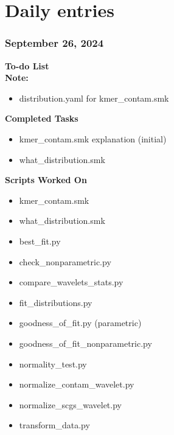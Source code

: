 \documentclass[11pt]{report}
\newcommand{\done}{\checkmark}
\newcommand{\draft}{\faPencil}
\begin{document}
{\newpage






\nolinenumbers
\part{Daily entries}

\pagestyle{fancy}
\fancyhf{}
\fancyhead[C]{\leftmark}  %
\fancyhead[R]{\thepage}

\renewcommand{\thesection}{\arabic{section}}
\setcounter{section}{0}
\setcounter{subsection}{0}

	

\begin{multicols}{2}
\section{September 26, 2024}


\textbf{To-do List} \\
\textbf{Note:} 

\begin{itemize}
	\item [\done] distribution.yaml for kmer\_contam.smk
	
	
\end{itemize}

\textbf{Completed Tasks}
\begin{itemize}
	\item [\done] kmer\_contam.smk explanation (initial)
	\item [\draft] what\_distribution.smk
	
\end{itemize}

\textbf{Scripts Worked On}
\begin{itemize}
	\item kmer\_contam.smk
	\item what\_distribution.smk
	\item best\_fit.py
	\item check\_nonparametric.py
	\item compare\_wavelets\_stats.py
	\item fit\_distributions.py
	\item goodness\_of\_fit.py (parametric)
	\item goodness\_of\_fit\_nonparametric.py
	\item normality\_test.py
	\item normalize\_contam\_wavelet.py
	\item normalize\_scgs\_wavelet.py
	\item transform\_data.py
	

\end{itemize}
\end{multicols}}
\end{document}
